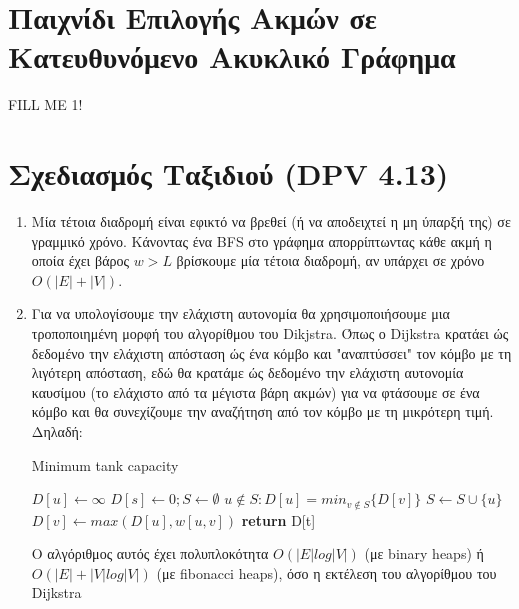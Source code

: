 \documentclass[a4paper,11pt]{article}
\begin{document}
\renewcommand{\labelenumi}{\roman{enumi})}
\renewcommand{\labelenumii}{ (\arabic{enumii}) }



\section{Παιχνίδι Επιλογής Ακμών σε Κατευθυνόμενο Ακυκλικό Γράφημα} \setcounter{section}{1}
FILL ME 1!


\section{Σχεδιασμός Ταξιδιού (DPV 4.13)}
\begin{enumerate}
\item Μία τέτοια διαδρομή είναι εφικτό να βρεθεί (ή να αποδειχτεί η μη ύπαρξή
της) σε γραμμικό χρόνο. Κάνοντας ένα BFS στο γράφημα απορρίπτωντας κάθε ακμή η
οποία έχει βάρος $w > L$ βρίσκουμε μία τέτοια διαδρομή, αν υπάρχει σε χρόνο
$O(|E| + |V|)$.
\item Για να υπολογίσουμε την ελάχιστη αυτονομία θα χρησιμοποιήσουμε μια
τροποποιημένη μορφή του αλγορίθμου του Dikjstra. Όπως ο Dijkstra κρατάει ώς
δεδομένο την ελάχιστη απόσταση ώς ένα κόμβο και "αναπτύσσει" τον κόμβο με τη
λιγότερη απόσταση, εδώ θα κρατάμε ώς δεδομένο την ελάχιστη αυτονομία καυσίμου
(το ελάχιστο από τα μέγιστα βάρη ακμών) για να φτάσουμε σε ένα κόμβο και θα
συνεχίζουμε την αναζήτηση από τον κόμβο με τη μικρότερη τιμή. Δηλαδή:
\begin{algorithm}[H]
\caption{Minimum tank capacity}
\begin{algorithmic}[1]
	    \State $D[u] \gets \infty$
	\EndFor
	\State $D[s] \gets 0 ; S \gets \emptyset$
	    \State $u \notin S : D[u] = min_{v \notin S}\{D[v]\}$
		\State $S \gets S \cup \{u\}$
	\EndWhile
			\State $D[v] \gets max(D[u], w[u,v])$
		\EndIf
	\EndFor
	\State \textbf{return} D[t]
\EndProcedure
\end{algorithmic}
\end{algorithm}

Ο αλγόριθμος αυτός έχει πολυπλοκότητα $O(|E|log|V|)$ (με binary heaps) ή
$O(|E| + |V|log|V|)$ (με fibonacci heaps), όσο η εκτέλεση του αλγορίθμου του
Dijkstra
\end{enumerate}
\end{document}
